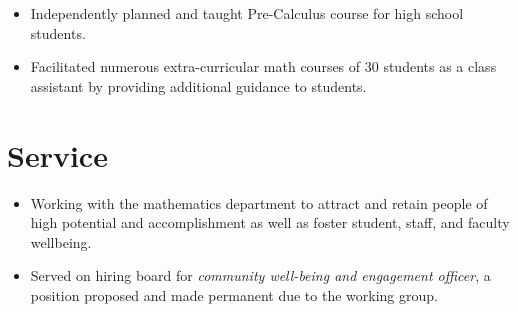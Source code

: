 \documentclass{cultvoucher}
\begin{document}
\begin{itemize}
	\item Independently planned and taught Pre-Calculus course for high school students.
	\item Facilitated numerous extra-curricular math courses of 30 students as a class assistant by providing additional guidance to students.
\end{itemize}

\section{Service}

\begin{itemize}
	\item Working with the mathematics department to attract and retain people of high potential and accomplishment as well as foster student, staff, and faculty wellbeing.
	\item Served on hiring board for \emph{community well-being and engagement officer}, a position proposed and made permanent due to the working group.
\end{itemize}


\end{document}
